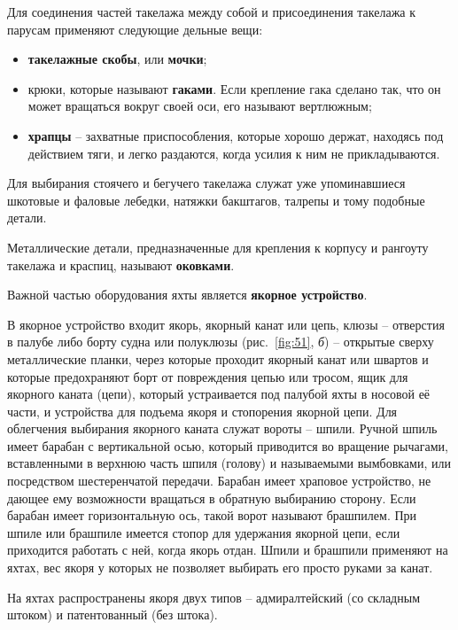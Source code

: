 \documentclass[a4paper, 12pt, twoside, final]{scrbook}
\begin{document}
Для соединения частей такелажа между собой и присоединения такелажа к парусам применяют следующие дельные вещи:

\begin{itemize}
\item \textbf{такелажные скобы}, или \textbf{мочки}; 
\item крюки, которые называют \textbf{гаками}. Если крепление гака сделано так, что он может вращаться вокруг своей оси, его называют вертлюжным;
\item \textbf{храпцы} \--- захватные приспособления, которые хорошо держат, находясь под действием тяги, и легко раздаются, когда усилия к ним не прикладываются.
\end{itemize}

Для выбирания стоячего и бегучего такелажа служат уже упоминавшиеся шкотовые и фаловые лебедки, натяжки бакштагов, талрепы и тому подобные детали.

Металлические детали, предназначенные для крепления к корпусу и рангоуту такелажа и краспиц, называют \textbf{оковками}.

Важной частью оборудования яхты является \textbf{якорное устройство}.

В якорное устройство входит якорь, якорный канат или цепь, клюзы \--- отверстия в палубе либо борту судна или полуклюзы (рис.~\ref{fig:51}, \textit{б}) \--- открытые сверху металлические планки, через которые проходит якорный канат или швартов и которые предохраняют борт от повреждения цепью или тросом, ящик для якорного каната (цепи), который устраивается под палубой яхты в носовой её части, и устройства для подъема якоря и стопорения якорной цепи. Для облегчения выбирания якорного каната служат вороты \--- шпили. Ручной шпиль имеет барабан с вертикальной осью, который приводится во вращение рычагами, вставленными в верхнюю часть шпиля (голову) и называемыми вымбовками, или посредством шестеренчатой передачи. Барабан имеет храповое устройство, не дающее ему возможности вращаться в обратную выбиранию сторону. Если барабан имеет горизонтальную ось, такой ворот называют брашпилем. При шпиле или брашпиле имеется стопор для удержания якорной цепи, если приходится работать с ней, когда якорь отдан. Шпили и брашпили применяют на яхтах, вес якоря у которых не позволяет выбирать его просто руками за канат.

На яхтах распространены якоря двух типов \--- адмиралтейский (со складным штоком) и патентованный (без штока).
\end{document}
